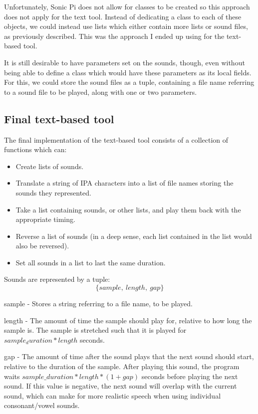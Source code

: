 \documentclass[12pt,a4paper,twoside,openright]{report}
\begin{document}
Unfortunately, Sonic Pi does not allow for classes to be created so this approach does not apply for the text tool. Instead of dedicating a class to each of these objects, we could instead use lists which either contain more lists or sound files, as previously described. This was the approach I ended up using for the text-based tool.

It is still desirable to have parameters set on the sounds, though, even without being able to define a class which would have these parameters as its local fields. For this, we could store the sound files as a tuple, containing a file name referring to a sound file to be played, along with one or two parameters.

\subsection{Final text-based tool}
The final implementation of the text-based tool consists of a collection of functions which can:
\begin{itemize}
    \item Create lists of sounds.
    \item Translate a string of IPA characters into a list of file names storing the sounds they represented.
    \item Take a list containing sounds, or other lists, and play them back with the appropriate timing.
    \item Reverse a list of sounds (in a deep sense, each list contained in the list would also be reversed).
    \item Set all sounds in a list to last the same duration.
\end{itemize}

Sounds are represented by a tuple:
\begin{equation*}
    \{sample,\ length,\ gap\}
\end{equation*}

sample - Stores a string referring to a file name, to be played.

length - The amount of time the sample should play for, relative to how long the sample is. The sample is stretched such that it is played for $sample_duration * length$ seconds.

gap - The amount of time after the sound plays that the next sound should start, relative to the duration of the sample. After playing this sound, the program waits $sample\_duration * length * (1 + gap)$ seconds before playing the next sound. If this value is negative, the next sound will overlap with the current sound, which can make for more realistic speech when using individual consonant/vowel sounds.
\newpage
\end{document}
